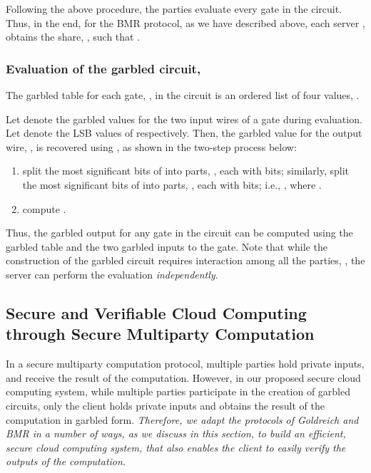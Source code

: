 \documentclass[10pt,journal,cspaper,compsoc]{IEEEtran}
\begin{document}
Following the above procedure, the  parties evaluate every gate in the circuit. Thus, in the end, for the BMR protocol, as we have described above,  each server , obtains the share, , such that .


\subsubsection{Evaluation of the garbled circuit, }
\label{sec_garbled_circuit_BMR_evaluation}

The garbled table for each gate, , in the circuit is an ordered list of four values, .


Let  denote the garbled values for the two input wires of a gate during evaluation. Let  denote the LSB values of  respectively. Then, the garbled value for the output wire, , is recovered using , as shown in the two-step process below:

\begin{enumerate}
    \item{split the most significant  bits of  into  parts, , each with  bits; similarly, split the most significant  bits of  into  parts, , each with  bits; i.e., , where .}

    \item{compute .}\end{enumerate}

Thus, the garbled output for any gate in the circuit can be computed using the garbled table and the two garbled inputs to the gate. Note that while the construction of the garbled circuit requires interaction among all the  parties, , the server  can perform the evaluation {\em independently}.


\subsection{Secure and Verifiable Cloud Computing through Secure Multiparty Computation}
\label{sec_key_changes_to_BMR_Goldreich}

In a secure multiparty computation protocol, multiple parties hold private inputs, and receive the result of the computation. However, in our proposed secure cloud computing system, while multiple parties participate in the creation of garbled circuits, only the client holds private inputs and obtains the result of the computation in garbled form. {\em Therefore, we adapt the protocols of Goldreich and BMR in a number of ways, as we discuss in this section, to build an efficient, secure cloud computing system, that also enables the client to easily verify the outputs of the computation.}
\end{document}
